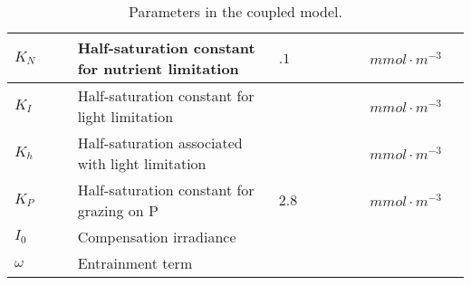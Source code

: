 \documentclass{article}
\begin{document}
\begin{table}[ht]
\footnotesize
\centering\renewcommand{}
\setcellgapes{3pt}\makegapedcells
\vspace{-10pt}
    \begin{tabular}{||l|l|l|l|l||}
        $K_{N}$ & Half-saturation constant for nutrient limitation & $.1$ & $mmol \cdot m^{-3}$ & \cite{sarmiento_gruber_2006}\\
        \hline
        $K_{I}$ & Half-saturation constant for light limitation & & $mmol \cdot m^{-3}$ & \\
        \hline
        $K_{h}$ & Half-saturation associated with light limitation & & $mmol \cdot m^{-3}$ & \\
        \hline
        $ K_{P} \qquad $ & Half-saturation constant for grazing on P & $2.8 \qquad \qquad$ & $mmol \cdot m^{-3}$ & \cite{sarmiento_gruber_2006}\\
        \hline
        $I_0$ & Compensation irradiance & & &\\
        \hline
        $\omega$ & Entrainment term & & &\\ 
        \hline
    \end{tabular}
    \caption{Parameters in the coupled model.}
    \label{tab:coupled_parameters}
\end{table}



\end{document}
